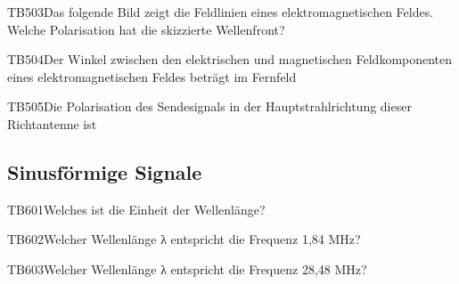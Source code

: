 \begin{question}{TB503}{Das folgende Bild zeigt die Feldlinien eines elektromagnetischen Feldes. Welche Polarisation hat die skizzierte Wellenfront?}
\end{question}

\begin{question}{TB504}{Der Winkel zwischen den elektrischen und magnetischen Feldkomponenten eines elektromagnetischen Feldes beträgt im Fernfeld}
\end{question}

\begin{question}{TB505}{Die Polarisation des Sendesignals in der Hauptstrahlrichtung dieser Richtantenne ist}
\end{question}

\subsection{Sinusförmige Signale}

\begin{question}{TB601}{Welches ist die Einheit der Wellenlänge?}
\end{question}

\begin{question}{TB602}{Welcher Wellenlänge λ entspricht die Frequenz 1,84 MHz?}
\end{question}

\begin{question}{TB603}{Welcher Wellenlänge λ entspricht die Frequenz 28,48 MHz?}
\end{question}

